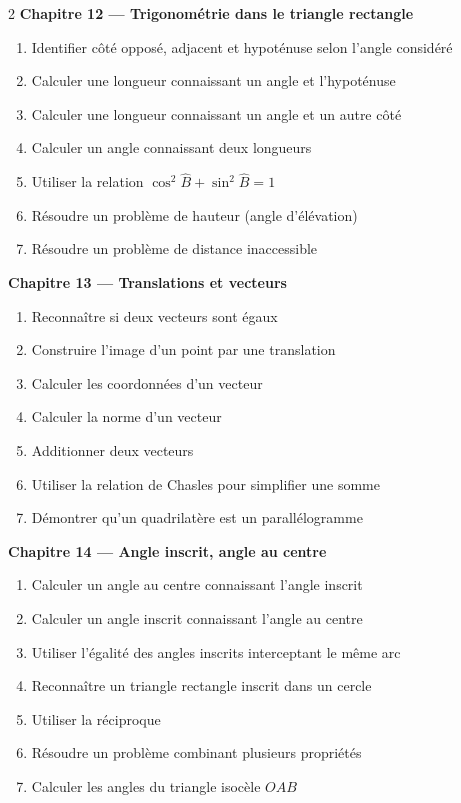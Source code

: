 \begin{multicols}{2}
\textbf{\normalsize\color{onbo}Chapitre 12 --- Trigonométrie dans le triangle rectangle}
\begin{enumerate}[label=\arabic*.,itemsep=1pt,topsep=2pt,leftmargin=1.6em]
\item Identifier côté opposé, adjacent et hypoténuse selon l'angle considéré
\item Calculer une longueur connaissant un angle et l'hypoténuse
\item Calculer une longueur connaissant un angle et un autre côté
\item Calculer un angle connaissant deux longueurs
\item Utiliser la relation $\cos^{2}\widehat B+\sin^{2}\widehat B=1$
\item Résoudre un problème de hauteur (angle d'élévation)
\item Résoudre un problème de distance inaccessible
\end{enumerate}
\vspace{4pt}

\textbf{\normalsize\color{onbo}Chapitre 13 --- Translations et vecteurs}
\begin{enumerate}[label=\arabic*.,itemsep=1pt,topsep=2pt,leftmargin=1.6em]
\item Reconnaître si deux vecteurs sont égaux
\item Construire l'image d'un point par une translation
\item Calculer les coordonnées d'un vecteur
\item Calculer la norme d'un vecteur
\item Additionner deux vecteurs
\item Utiliser la relation de Chasles pour simplifier une somme
\item Démontrer qu'un quadrilatère est un parallélogramme
\end{enumerate}
\vspace{4pt}

\textbf{\normalsize\color{onbo}Chapitre 14 --- Angle inscrit, angle au centre}
\begin{enumerate}[label=\arabic*.,itemsep=1pt,topsep=2pt,leftmargin=1.6em]
\item Calculer un angle au centre connaissant l'angle inscrit
\item Calculer un angle inscrit connaissant l'angle au centre
\item Utiliser l'égalité des angles inscrits interceptant le même arc
\item Reconnaître un triangle rectangle inscrit dans un cercle
\item Utiliser la réciproque
\item Résoudre un problème combinant plusieurs propriétés
\item Calculer les angles du triangle isocèle $OAB$
\end{enumerate}
\vspace{4pt}


\end{multicols}
